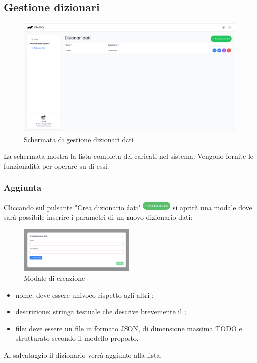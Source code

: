 \subsection{Gestione dizionari}
\begin{figure}[H]
  \centering
  \includegraphics[width=1\textwidth]{assets/dd_list.png}
  \caption{Schermata di gestione dizionari dati}
\end{figure}
\par La schermata mostra la lista completa dei  caricati nel sistema. Vengono fornite le funzionalità per operare su di essi.

\subsubsection{Aggiunta }
Cliccando sul pulsante "Crea dizionario dati" \includegraphics[height=1.2em]{assets/dd_create_button.png} si aprirà una modale dove sarà possibile inserire i parametri di un nuovo dizionario dati:
\begin{figure}[H]
  \centering
  \includegraphics[width=0.5\textwidth]{assets/dd_modal_create.png}
  \caption{Modale di creazione }
\end{figure}
\begin{itemize}
  \item nome: deve essere univoco rispetto agli altri ;
  \item descrizione: stringa testuale che descrive brevemente il ;
  \item file: deve essere un file in formato JSON, di dimensione massima TODO e strutturato secondo il modello proposto.
\end{itemize}
Al salvataggio il dizionario verrà aggiunto alla lista.

